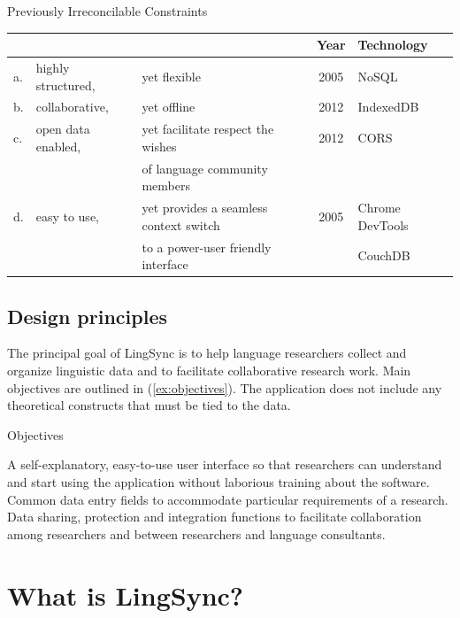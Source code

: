 \documentclass[letterpaper, 12pt, dvips]{mitwpl}
\begin{document}
\begin{exe}
\ex  Previously Irreconcilable Constraints

\begin{tabular}{lllcl}
&& & Year & Technology \\\hline\hline
a. & highly structured, & yet flexible & 2005 & NoSQL\\\hline
b. & collaborative, & yet offline  & 2012 &  IndexedDB\\\hline
c. & open data enabled,  &yet facilitate respect the wishes  & 2012 & CORS \\
&&  of language community members \\\hline
d. & easy to use,  &yet provides a seamless context switch  & 2005 & Chrome DevTools  \\
&& to a power-user friendly interface && CouchDB
\end{tabular}
\label{ex:Irreconcilable}
\end{exe}



\subsection{Design principles} 
\label{sec:design}

The principal goal of LingSync is to help language researchers collect and organize linguistic data and to facilitate collaborative research work. Main objectives are outlined in (\ref{ex:objectives}). 
  The application does not include any theoretical constructs that must be tied to the data.  
  


\begin{exe} 
\ex Objectives

\begin{xlist}
        \ex  A self-explanatory, easy-to-use user interface so that researchers can understand and start using the application without laborious training about the software.
        \ex Common data entry fields to accommodate particular requirements of a research.  
        \ex  Data sharing, protection and integration functions to facilitate collaboration among researchers and between researchers and language consultants. 
    \end{xlist}
\label{ex:objectives}
\end{exe}



\section{What is LingSync?}
\label{sec:what}
\end{document}
